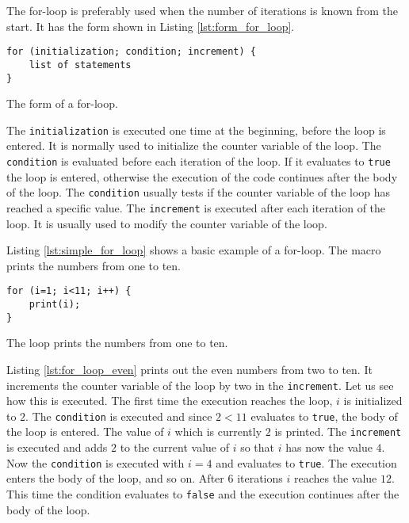 The for-loop is preferably used when the number of iterations is known from the start. It has the form shown in Listing \ref{lst:form_for_loop}.

\begin{listing}[H]
\begin{verbatim}
for (initialization; condition; increment) {
	list of statements
}
\end{verbatim}
\caption{The form of a for-loop.}
\label{lst:form_for_loop}
\end{listing}

The  {\tt initialization} is executed one time at the beginning, before the loop is entered. It is normally used to initialize the counter variable of the loop. The {\tt condition} is evaluated before each iteration of the loop. If it evaluates to {\tt true} the loop is entered, otherwise the execution of the code continues after the body of the loop. The {\tt condition} usually tests if the counter variable of the loop has reached a specific value. The {\tt increment} is executed after each iteration of the loop. It is usually used to modify the counter variable of the loop.

Listing \ref{lst:simple_for_loop} shows a basic example of a for-loop. The macro prints the numbers from one to ten.

\begin{listing}[H]
\begin{verbatim}
for (i=1; i<11; i++) {
	print(i);
}
\end{verbatim}
\caption{The loop prints the numbers from one to ten.}
\label{lst:simple_for_loop}
\end{listing}

Listing \ref{lst:for_loop_even} prints out the even numbers from two to ten. It increments the counter variable of the loop by two in the {\tt increment}. Let us see how this is executed. The first time the execution reaches the loop, $i$ is initialized to $2$. The {\tt condition} is executed and since $2<11$ evaluates to {\tt true}, the body of the loop is entered. The value of $i$ which is currently $2$ is printed. The {\tt increment} is executed and adds $2$ to the current value of $i$ so that $i$ has now the value $4$. Now the {\tt condition} is executed with $i=4$ and evaluates to {\tt true}. The execution enters the body of the loop, and so on. After $6$ iterations $i$ reaches the value $12$. This time the condition evaluates to {\tt false} and the execution continues after the body of the loop.

